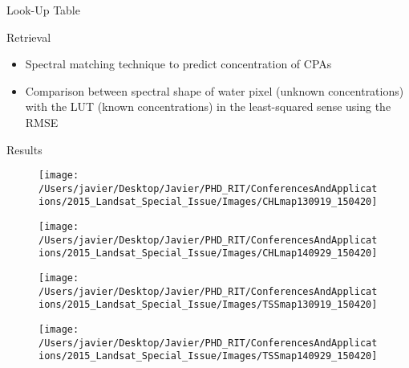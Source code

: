\documentclass{beamer}
\begin{document}
\begin{frame}{}
\begin{columns}[t]
\begin{column}{.32\linewidth}
\begin{block}{Look-Up Table}
\begin{figure}[htb]
\end{figure}


\end{block}
\begin{block}{Retrieval}
  \begin{itemize}
    \item Spectral matching technique to predict concentration of CPAs
    \vspace{0.5cm}
    \item Comparison between spectral shape of water pixel (unknown concentrations) with the LUT (known concentrations) in the least-squared sense using the RMSE
  \end{itemize}
\end{block}

\begin{block}{Results}

\begin{figure}[htbp!]
  \begin{minipage}[c]{0.46\linewidth}
      \centering
      \texttt{[image: /Users/javier/Desktop/Javier/PHD\_RIT/ConferencesAndApplications/2015\_Landsat\_Special\_Issue/Images/CHLmap130919\_150420]}  
  \end{minipage}
  \hspace{1cm}
  \begin{minipage}[c]{0.46\linewidth}
      \centering
      \texttt{[image: /Users/javier/Desktop/Javier/PHD\_RIT/ConferencesAndApplications/2015\_Landsat\_Special\_Issue/Images/CHLmap140929\_150420]}  
  \end{minipage}
% 
  \begin{minipage}[c]{0.46\linewidth}
      \centering
      \texttt{[image: /Users/javier/Desktop/Javier/PHD\_RIT/ConferencesAndApplications/2015\_Landsat\_Special\_Issue/Images/TSSmap130919\_150420]}  
  \end{minipage}
  \hspace{1cm}
  \begin{minipage}[c]{0.46\linewidth}
      \centering
      \texttt{[image: /Users/javier/Desktop/Javier/PHD\_RIT/ConferencesAndApplications/2015\_Landsat\_Special\_Issue/Images/TSSmap140929\_150420]}  
  \end{minipage}


\end{figure}
\end{block}
\end{column}
\end{columns}
\end{frame}
\end{document}
